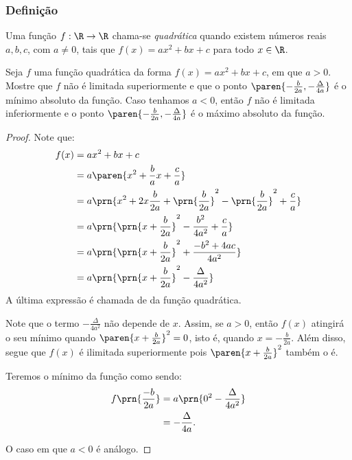 \subsubsection{Definição}

\begin{definition}
Uma função $f: \R \to \R$ chama-se \emph{quadrática} quando existem
números reais $a, b, c$, com $a \neq 0$, tais que $f(x) = ax^2 +bx
+c$ para todo $x \in \R$.
\end{definition}

\begin{proposition}
Seja $f$ uma função quadrática da forma $f(x) = ax^2 + bx +c$, em que
$a >0$. Mostre que $f$ não é limitada superiormente e que o ponto
$\paren{-\frac {b} {2a}, -\frac {\Delta} {4a}}$ é o mínimo absoluto
da função. Caso tenhamos $a<0$, então $f$ não é limitada inferiormente e  o
ponto $\paren{-\frac {b} {2a}, -\frac {\Delta} {4a}}$ é o máximo
absoluto da função.
\end{proposition}

\begin{proof}
    Note que:
    \begin{align*}
        f(x) &= ax^2+bx+c\\
        &= a\paren{x^2 + \frac b a x + \frac c a} \\
        &= a\prn{x^2+2x\frac b {2a} + \prn{\frac b {2a}}^2  - \prn{\frac b {2a}}^2 + \frac c a} \\
        &= a\prn{\prn{x+\frac{b}{2a}}^2 - \frac{b^2}{4a^2}+\frac c a}\\
        &= a\prn{\prn{x+\frac{b}{2a}}^2 + \frac{-b^2+4ac}{4a^2}} \\
        &= a\prn{\prn{x+\frac{b}{2a}}^2 - \frac{\Delta}{4a^2}} \\
    \end{align*}
    \noindent A última expressão é chamada de  da função quadrática.

    Note que o termo $-\frac{\Delta}{4a^2}$ não depende de $x$. 
    Assim, se $a>0$, então $f(x)$ atingirá o seu mínimo quando $\paren{x+\frac b {2a}}^2=0$, isto é, quando
    $x = -\frac b {2a}$. 
    Além disso, segue que $f(x)$ é ilimitada superiormente pois $\paren{x+\frac{b}{2a}}^2$ também o é.

    Teremos o mínimo da função como sendo:
    \begin{align*}
        f\prn{\frac{-b}{2a}} &= a\prn{0^2-\frac{\Delta}{4a^2}} \\ &= -\frac{\Delta}{4a}.
    \end{align*}

    O caso em que $a<0$ é análogo.
\end{proof}

